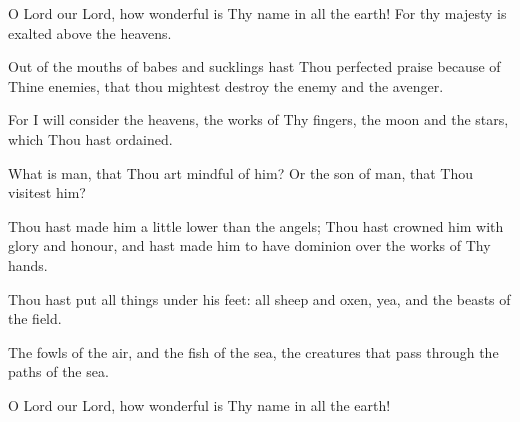 O Lord our Lord, how wonderful is Thy name in all the earth! For thy majesty is exalted above the heavens.

Out of the mouths of babes and sucklings hast Thou perfected praise because of Thine enemies, that thou mightest destroy the enemy and the avenger.

For I will consider the heavens, the works of Thy fingers, the moon and the stars, which Thou hast ordained.

What is man, that Thou art mindful of him? Or the son of man, that Thou visitest him?

Thou hast made him a little lower than the angels; Thou hast crowned him with glory and honour, and hast made him to have dominion over the works of Thy hands.

Thou hast put all things under his feet: all sheep and oxen, yea, and the beasts of the field.

The fowls of the air, and the fish of the sea, the creatures that pass through the paths of the sea.

O Lord our Lord, how wonderful is Thy name in all the earth!
